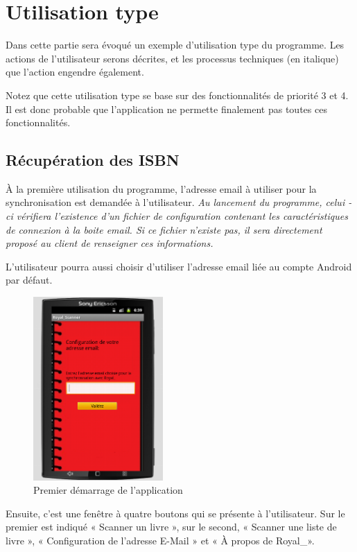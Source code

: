 \section{Utilisation type}
Dans cette partie sera évoqué un exemple d'utilisation type du programme.
Les actions de l'utilisateur serons décrites, et les processus techniques (en italique) que l'action engendre également. 

Notez que cette utilisation type se base sur des fonctionnalités de priorité 3 et 4.
Il est donc probable que l'application ne permette finalement pas toutes ces fonctionnalités. 

\subsection{Récupération des ISBN}

À la première utilisation du programme, l'adresse email à utiliser pour la synchronisation est demandée à l'utilisateur.
\emph{Au lancement du programme, celui - ci vérifiera l'existence d'un fichier de configuration contenant les caractéristiques de connexion à la boite email.
	Si ce fichier n'existe pas, il sera directement proposé au client de renseigner ces informations.}

L'utilisateur pourra aussi choisir d'utiliser l'adresse email liée au compte Android par défaut.
\begin{figure}[h]
\begin{center}
\includegraphics[height=7cm]{../img/Royal_Scanner_configuepremiermail.png}
\end{center}
\caption{Premier démarrage de l'application}
\end{figure}

Ensuite, c'est une fenêtre à quatre boutons qui se présente à l'utilisateur. 
Sur le premier est indiqué « Scanner un livre », sur le second, « Scanner une liste de livre », « Configuration de l'adresse E-Mail » et « À propos de Royal\_». 

